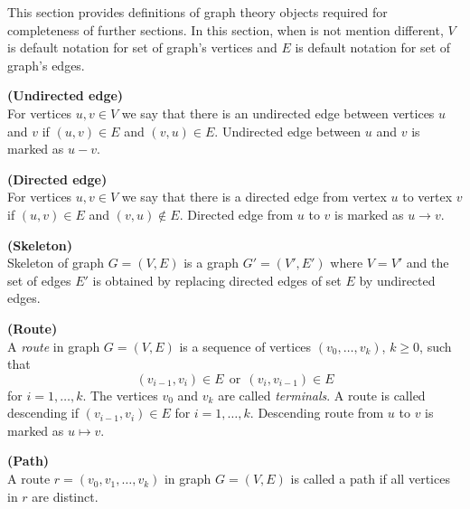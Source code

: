 %
%


This section provides definitions of graph theory objects required for completeness of further sections.
In this section, when is not mention different, $V$ is default notation for set of graph's vertices and 
$E$ is default notation for set of graph's edges. 


\begin{defi}{\textbf{(Undirected edge)}} \\
	For vertices $u, v \in V$ we say that there is an undirected edge between vertices $u$ 
	and $v$ if $(u, v) \in E$ and $(v, u) \in E$. Undirected edge between $u$ and $v$ is marked as $u-v$.
\end{defi}


\begin{defi} {\textbf{(Directed edge)}} \\
	For vertices $u, v \in V$ we say that there is a directed edge from vertex $u$ to vertex $v$ if
	$(u, v) \in E$ and $(v, u) \notin E$. Directed edge from $u$ to $v$ is marked as $u \rightarrow v$.
\end{defi}


\begin{defi} {\textbf{(Skeleton)}} \\
	Skeleton of graph $G = (V, E)$ is a graph $G' = (V', E')$ where $V = V'$ and the set of edges $E'$
	is obtained by replacing directed edges of set $E$ by undirected edges.
\end{defi}


\begin{defi} {\textbf{(Route)}} \\
	A \textit{route} in graph $G = (V, E)$ is a sequence of vertices $(v_0, \dots, v_k)$, $k \ge 0$, such that 
	$$ (v_{i-1}, v_i) \in E \ \  \mbox{or} \ \ (v_i, v_{i-1}) \in E$$
	for $i = 1, \dots, k$. The vertices $v_0$ and $v_k$ are called \textit{terminals}. A route is called descending
	if $(v_{i-1}, v_i) \in E$ for $i = 1, \dots, k$. Descending route from $u$ to $v$ is marked as $u \mapsto v$. 
\end{defi}


\begin{defi} {\textbf{(Path)}} \\
	A route $r = (v_0, v_1, \dots, v_k)$ in graph $G = (V, E)$ is called a path if all vertices in $r$ are distinct.
\end{defi}


